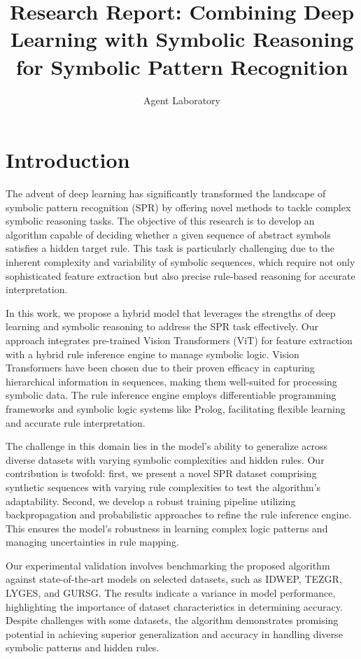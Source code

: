 \documentclass{article}
\title{Research Report: Combining Deep Learning with Symbolic Reasoning for Symbolic Pattern Recognition}
\author{Agent Laboratory}
\begin{document}
\maketitle

\begin{abstract}

\end{abstract}

\section{Introduction}
The advent of deep learning has significantly transformed the landscape of symbolic pattern recognition (SPR) by offering novel methods to tackle complex symbolic reasoning tasks. The objective of this research is to develop an algorithm capable of deciding whether a given sequence of abstract symbols satisfies a hidden target rule. This task is particularly challenging due to the inherent complexity and variability of symbolic sequences, which require not only sophisticated feature extraction but also precise rule-based reasoning for accurate interpretation.

In this work, we propose a hybrid model that leverages the strengths of deep learning and symbolic reasoning to address the SPR task effectively. Our approach integrates pre-trained Vision Transformers (ViT) for feature extraction with a hybrid rule inference engine to manage symbolic logic. Vision Transformers have been chosen due to their proven efficacy in capturing hierarchical information in sequences, making them well-suited for processing symbolic data. The rule inference engine employs differentiable programming frameworks and symbolic logic systems like Prolog, facilitating flexible learning and accurate rule interpretation.

The challenge in this domain lies in the model's ability to generalize across diverse datasets with varying symbolic complexities and hidden rules. Our contribution is twofold: first, we present a novel SPR dataset comprising synthetic sequences with varying rule complexities to test the algorithm's adaptability. Second, we develop a robust training pipeline utilizing backpropagation and probabilistic approaches to refine the rule inference engine. This ensures the model's robustness in learning complex logic patterns and managing uncertainties in rule mapping.

Our experimental validation involves benchmarking the proposed algorithm against state-of-the-art models on selected datasets, such as IDWEP, TEZGR, LYGES, and GURSG. The results indicate a variance in model performance, highlighting the importance of dataset characteristics in determining accuracy. Despite challenges with some datasets, the algorithm demonstrates promising potential in achieving superior generalization and accuracy in handling diverse symbolic patterns and hidden rules.
\end{document}
